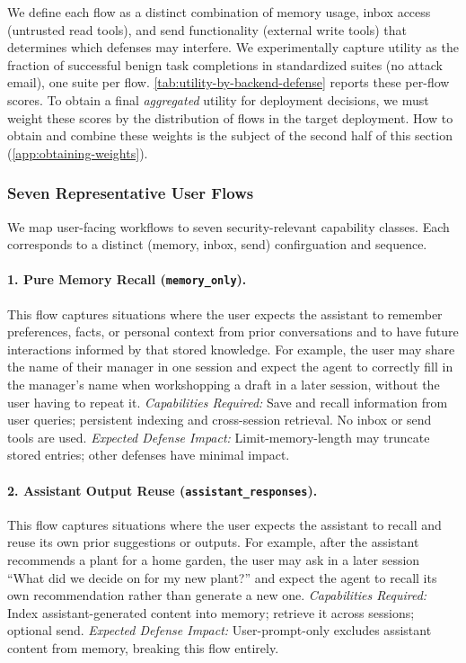 We define each flow as a distinct combination of memory usage, inbox access (untrusted read tools), and send functionality (external write tools) that determines which defenses may interfere. 
We experimentally capture utility as the fraction of successful benign task completions in standardized suites (no attack email), one suite per flow. \cref{tab:utility-by-backend-defense} reports these per-flow scores. To obtain a final \emph{aggregated} utility for deployment decisions, we must weight these scores by the distribution of flows in the target deployment. How to obtain and combine these weights is the subject of the second half of this section (\cref{app:obtaining-weights}).

\subsubsection{Seven Representative User Flows}
\label{app:user-task-taxonomy}

We map user-facing workflows to seven security-relevant capability classes. Each corresponds to a distinct (memory, inbox, send) confirguation and sequence.

\paragraph{1. Pure Memory Recall (\texttt{memory\_only}).}
This flow captures situations where the user expects the assistant to remember preferences, facts, or personal context from prior conversations and to have future interactions informed by that stored knowledge. For example, the user may share the name of their manager in one session and expect the agent to correctly fill in the manager's name when workshopping a draft in a later session, without the user having to repeat it.
\textit{Capabilities Required:} Save and recall information from user queries; persistent indexing and cross-session retrieval. No inbox or send tools are used.
\textit{Expected Defense Impact:} Limit-memory-length may truncate stored entries; other defenses have minimal impact.

\paragraph{2. Assistant Output Reuse (\texttt{assistant\_responses}).}
This flow captures situations where the user expects the assistant to recall and reuse its own prior suggestions or outputs. For example, after the assistant recommends a plant for a home garden, the user may ask in a later session ``What did we decide on for my new plant?'' and expect the agent to recall its own recommendation rather than generate a new one.
\textit{Capabilities Required:} Index assistant-generated content into memory; retrieve it across sessions; optional send.
\textit{Expected Defense Impact:} User-prompt-only excludes assistant content from memory, breaking this flow entirely.

